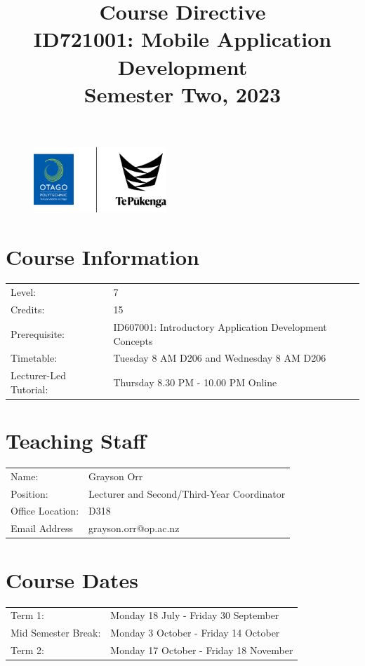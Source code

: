 \documentclass{article}
\author{}
\begin{document}
\begin{figure}
	\includegraphics[width=50mm]{../img/logo.png}
\end{figure}

\title{Course Directive\\ID721001: Mobile Application Development\\Semester Two, 2023}
\date{}
\maketitle

\section*{Course Information}
\begin{tabular}{ll}
	Level:        & 7 \\
	Credits:      & 15                                              \\
	Prerequisite: & ID607001: Introductory Application Development Concepts \\
	Timetable:    & Tuesday 8 AM D206 and Wednesday 8 AM D206\\
	Lecturer-Led Tutorial: & Thursday 8.30 PM - 10.00 PM Online     \\     
\end{tabular}

\section*{Teaching Staff}
\begin{tabular}{ll}
	Name:            & Grayson Orr                           \\
	Position:        & Lecturer and Second/Third-Year Coordinator \\
	Office Location: & D318                                 \\
	Email Address    & grayson.orr@op.ac.nz                    \\
\end{tabular}

\section*{Course Dates}
\begin{tabular}{ll}
	Term 1:             &  Monday 18 July - Friday 30 September \\
	Mid Semester Break: &  Monday 3 October - Friday 14 October     \\
	Term 2:             &  Monday 17 October - Friday 18 November      \\
\end{tabular}
\end{document}
